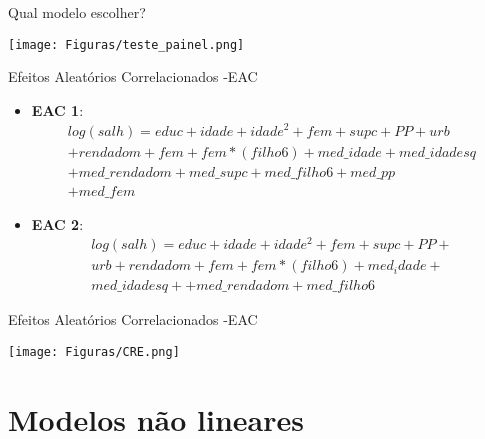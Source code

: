\documentclass[xcolor={dvipsnames}]{beamer}
\begin{document}
\begin{frame}{Qual modelo escolher?}
\begin{center}
    \texttt{[image: Figuras/teste\_painel.png]}
\end{center}
\end{frame}
\begin{frame}{Efeitos Aleatórios Correlacionados -EAC}
\begin{itemize}
    \item \textbf{EAC 1}:
    \begin{equation}
    \begin{split}
        log(salh) = educ +idade + idade^2 +fem + supc + PP+ urb\\+ rendadom+ fem + fem*(filho6) + med\_idade+med\_idadesq\\ + med\_rendadom + med\_supc+ med\_filho6 +med\_pp\\+ med\_fem
    \end{split}
    \end{equation} 
    \item \textbf{EAC 2}:
    \begin{equation}
    \begin{split}
        log(salh) = educ +idade + idade^2 + fem + supc +PP+\\urb+ rendadom+fem + fem*(filho6)+ med_idade+\\med\_idadesq+ +med\_rendadom +med\_filho6
    \end{split}
    \end{equation}
\end{itemize}
\end{frame}
\begin{frame}{Efeitos Aleatórios Correlacionados -EAC}
\begin{center}
    \texttt{[image: Figuras/CRE.png]}
\end{center}
\end{frame}
\section{Modelos não lineares}
\begin{frame}
    \tableofcontents[currentsection]
\end{frame}
\end{document}
